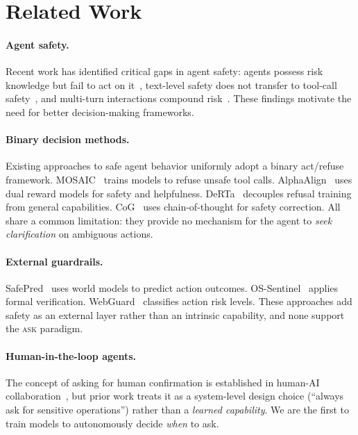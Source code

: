 \documentclass{article}
\newcommand{\ask}{\textcolor{askcolor}{\textsc{ask}}}
\begin{document}
\section{Related Work}
\label{sec:related}

\paragraph{Agent safety.} Recent work has identified critical gaps in agent safety: agents possess risk knowledge but fail to act on it~\cite{failtoact2025}, text-level safety does not transfer to tool-call safety~\cite{mindthegap2026}, and multi-turn interactions compound risk~\cite{unsafer2026}. These findings motivate the need for better decision-making frameworks.

\paragraph{Binary decision methods.} Existing approaches to safe agent behavior uniformly adopt a binary act/refuse framework. MOSAIC~\cite{mosaic2026} trains models to refuse unsafe tool calls. AlphaAlign~\cite{alphaalign2025} uses dual reward models for safety and helpfulness. DeRTa~\cite{derta2025} decouples refusal training from general capabilities. CoG~\cite{cog2025} uses chain-of-thought for safety correction. All share a common limitation: they provide no mechanism for the agent to \emph{seek clarification} on ambiguous actions.

\paragraph{External guardrails.} SafePred~\cite{safepred2026} uses world models to predict action outcomes. OS-Sentinel~\cite{ossentinel2025} applies formal verification. WebGuard~\cite{webguard2025} classifies action risk levels. These approaches add safety as an external layer rather than an intrinsic capability, and none support the \ask{} paradigm.

\paragraph{Human-in-the-loop agents.} The concept of asking for human confirmation is established in human-AI collaboration~\cite{autonomylevels2025}, but prior work treats it as a system-level design choice (``always ask for sensitive operations'') rather than a \emph{learned capability}. We are the first to train models to autonomously decide \emph{when} to ask.
\end{document}
